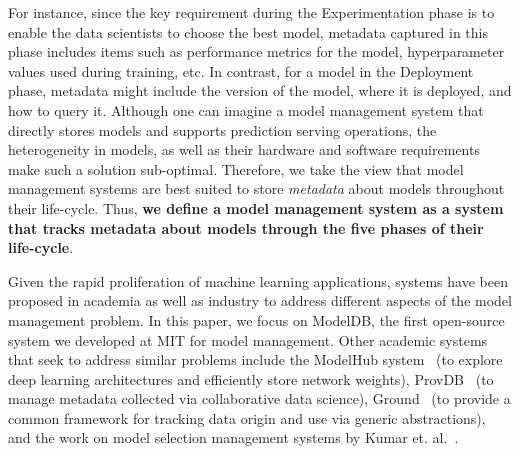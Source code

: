 \documentclass[11pt]{article}
\newcommand{\mlwfs}{ML workflows\xspace}
\newcommand{\mdb}{{\sc ModelDB}\xspace}
\newcommand{\dss}{data scientists\xspace}
\begin{document}
\newpage

For instance, since the key requirement during the Experimentation phase is to enable the \dss to choose the best model, metadata captured in this phase includes items such as performance metrics for the model, hyperparameter values used during training, etc.
In contrast, for a model in the Deployment phase, metadata might include the version of the model, where it is deployed, and how to query it.
Although one can imagine a model management system that directly stores models and supports prediction serving operations, the heterogeneity in models, as well as their hardware and software requirements make such a solution sub-optimal.
Therefore, we take the view that model management systems are best suited to store {\it metadata} about models throughout their life-cycle.
Thus, {\bf we define a model management system as a system that tracks metadata about models through the five phases of their life-cycle}.


Given the rapid proliferation of machine learning applications, systems have been proposed in academia as well as industry to address different aspects of the model management problem.
In this paper, we focus on \mdb, the first open-source system we developed at MIT for model management.
Other academic systems that seek to address similar problems include the ModelHub system~\cite{modelhub} (to explore deep learning architectures and efficiently store network weights), 
ProvDB~\cite{provdb} (to manage 
metadata collected via collaborative data science), Ground~\cite{hellerstein2017ground} (to provide a common
framework for tracking data origin and use via generic abstractions), and the work on model selection management systems by Kumar et. al.~\cite{msms}.
\end{document}
